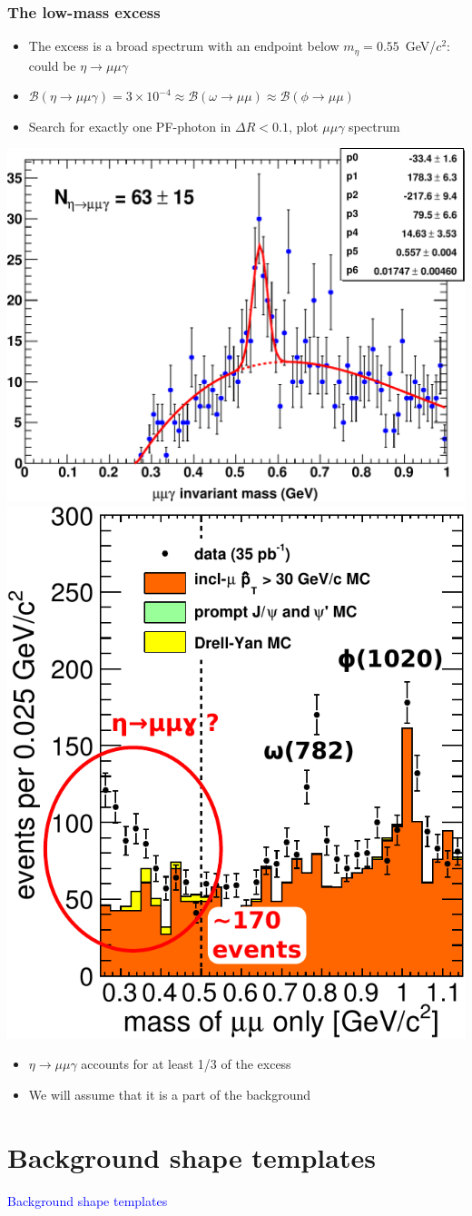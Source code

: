 \documentclass[compress]{beamer}
\begin{document}
\begin{frame}
\frametitle{The low-mass excess}

\begin{itemize}
\item The excess is a broad spectrum with an endpoint below $m_\eta = 0.55$~GeV/$c^2$: could be $\eta \to \mu\mu\gamma$
\item $\mathcal{B}(\eta \to \mu\mu\gamma) = 3\times 10^{-4} \approx \mathcal{B}(\omega \to \mu\mu) \approx \mathcal{B}(\phi \to \mu\mu)$
\item Search for exactly one PF-photon in $\Delta R < 0.1$, plot $\mu\mu\gamma$ spectrum
\end{itemize}

\includegraphics[height=4.7 cm]{eta_peak.pdf} \hfill
\includegraphics[height=4.7 cm]{mass_of_mumu_only.pdf}

\begin{itemize}
\item $\eta \to \mu\mu\gamma$ accounts for at least 1/3 of the excess
\item We will assume that it is a part of the background
\end{itemize}
\end{frame}

\section*{Background shape templates}
\begin{frame}
\begin{center}
\Huge \textcolor{blue}{Background shape templates}
\end{center}
\end{frame}
\end{document}
